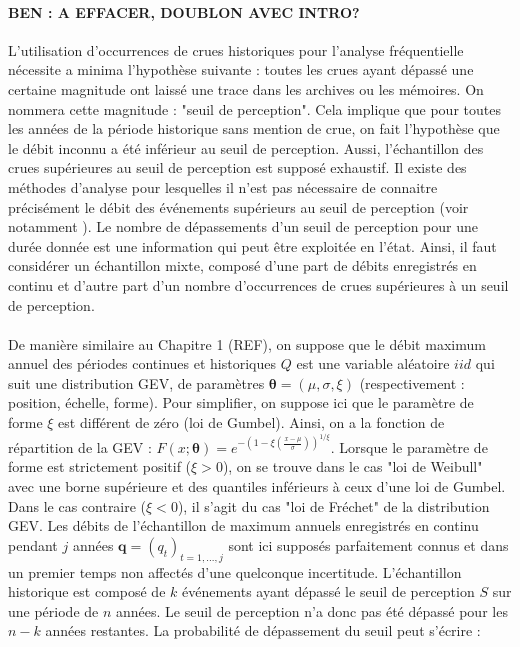 \documentclass[11pt]{article}
\begin{document}
	\paragraph{BEN : A EFFACER, DOUBLON AVEC INTRO?} 
	
		L'utilisation d'occurrences de crues historiques pour l'analyse fréquentielle nécessite a minima l'hypothèse suivante : toutes les crues ayant dépassé une certaine magnitude ont laissé une trace dans les archives ou les mémoires. On nommera cette magnitude : "seuil de perception". Cela implique que pour toutes les années de la période historique sans mention de crue, on fait l'hypothèse que le débit inconnu a été inférieur au seuil de perception. Aussi, l'échantillon des crues supérieures au seuil de perception est supposé exhaustif. Il existe des méthodes d'analyse pour lesquelles il n'est pas nécessaire de connaitre précisément le débit des événements supérieurs au seuil de perception (voir notamment \citet{stedinger_flood_1986}). Le nombre de dépassements d'un seuil de perception pour une durée donnée est une information qui peut être exploitée en l'état. Ainsi, il faut considérer un échantillon mixte, composé d'une part de débits enregistrés en continu et d'autre part d'un nombre d'occurrences de crues supérieures à un seuil de perception. 
			
		\paragraph{}
		De manière similaire au Chapitre 1 (REF), on suppose que le débit maximum annuel des périodes continues et historiques $Q$ est une variable aléatoire $iid$ qui suit une distribution GEV, de paramètres $\boldsymbol{\theta} = (\mu,\sigma,\xi)$ (respectivement : position, échelle, forme). Pour simplifier, on suppose ici que le paramètre de forme $\xi$ est différent de zéro (loi de Gumbel). Ainsi, on a la fonction de répartition de la GEV : $F(x;\boldsymbol{\theta}) = e^{-(1-\xi(\frac{x - \mu}{\sigma}))^{1/\xi}}$. Lorsque le paramètre de forme est strictement positif ($\xi > 0$), on se trouve dans le cas "loi de Weibull" avec une borne supérieure et des quantiles inférieurs à ceux d'une loi de Gumbel. Dans le cas contraire ($\xi < 0$), il s'agit du cas "loi de Fréchet" de la distribution GEV. Les débits de l'échantillon de maximum annuels enregistrés en continu pendant $j$ années $\boldsymbol{q}= (q_t)_{t=1,...,j}$ sont ici supposés parfaitement connus et dans un premier temps non affectés d'une quelconque incertitude. L'échantillon historique est composé de $k$ événements ayant dépassé le seuil de perception $S$ sur une période de $n$ années. Le seuil de perception n'a donc pas été dépassé pour les $n-k$ années restantes. La probabilité de dépassement du seuil peut s'écrire :
		
\end{document}
